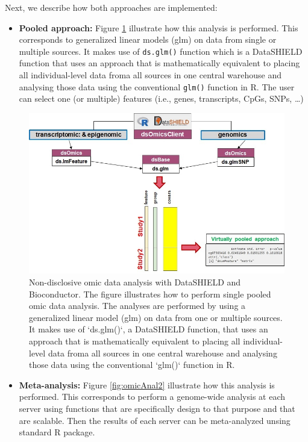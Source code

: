 \documentclass[]{article}
\providecommand{\tightlist}{%
  \setlength{\itemsep}{0pt}\setlength{\parskip}{0pt}}
\begin{document}
Next, we describe how both approaches are implemented:

\begin{itemize}
\tightlist
\item
  \textbf{Pooled approach:} Figure \ref{fig:omicAnal1} illustrate how
  this analysis is performed. This corresponds to generalized linear
  models (glm) on data from single or multiple sources. It makes use of
  \texttt{ds.glm()} function which is a DataSHIELD function that uses an
  approach that is mathematically equivalent to placing all
  individual-level data froma all sources in one central warehouse and
  analysing those data using the conventional \texttt{glm()} function in
  R. The user can select one (or multiple) features (i.e., genes,
  transcripts, CpGs, SNPs, \ldots)
\end{itemize}

\begin{figure}

{\centering \includegraphics[width=1\linewidth]{fig/dsOmics_B} 

}

\caption{Non-disclosive omic data analysis with DataSHIELD and Bioconductor. The figure illustrates how to perform single pooled omic data analysis. The analyses are performed by using a generalized linear model (glm) on data from one or multiple sources. It makes use of `ds.glm()`, a DataSHIELD function, that uses an approach that is mathematically equivalent to placing all individual-level data froma all sources in one central warehouse and analysing those data using the conventional `glm()` function in R.}\label{fig:omicAnal1}
\end{figure}

\begin{itemize}
\tightlist
\item
  \textbf{Meta-analysis:} Figure \ref{fig:omicAnal2} illustrate how this
  analysis is performed. This corresponds to perform a genome-wide
  analysis at each server using functions that are specifically design
  to that purpose and that are scalable. Then the results of each server
  can be meta-analyzed unsing standard R package.
\end{itemize}
\end{document}
